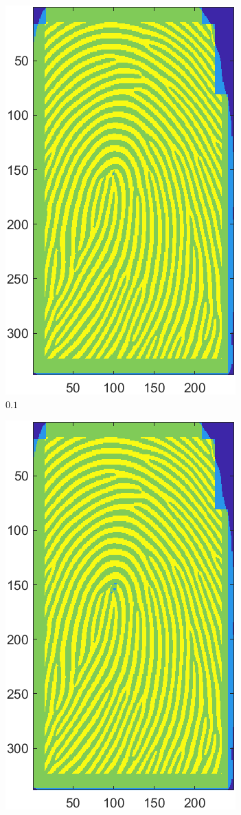 \documentclass[a4paper]{article}
\begin{document}
\begin{figure}[h!]
  \centering
       \begin{subfigure}[t]{0.2\textwidth}
         \centering
         \includegraphics[scale=0.5]{Figures/E4-e1-0.1}
         \caption{\(0.1\)}
     \end{subfigure}%
     \quad
     \begin{subfigure}[t]{0.2\textwidth}
         \centering
         \includegraphics[scale=0.5]{Figures/E4-e1-0.3}

\end{subfigure}
\end{figure}
\end{document}
